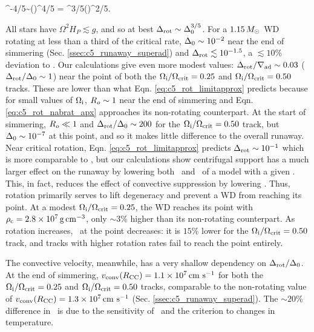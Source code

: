 \eqbegin
\dnabrot {}\rossby^{-4/5}\dnabconvzero \sim \left(\right)^{4/5} = \dnabconvzero^{3/5}\left(\right)^{2/5}.
\label{eq:c5_rot_limitapprox}
\eqend

\noindent All stars have $\Omega^2 H_P \lesssim g$, and so at best $\dnabrot \sim \dnabconvzero^{3/5}$.  For a $1.15\,\Msun$ WD rotating at less than a third of the critical rate, $\dnabconvzero \sim 10^{-2}$ near the end of simmering (Sec. \ref{ssec:c5_runaway_superad}) and $\dnabrot \lesssim 10^{-1.5}$, a $\lesssim10$\% deviation to \nablaad.  Our calculations give even more modest values: $\dnabrot/\nablaad \sim 0.03$ ($\dnabrot/\dnabconvzero \sim 1$) near the \citeal{wooswk04} point of both the $\Ominit/\Omcrit = 0.25$ and $\Ominit/\Omcrit = 0.50$ tracks.  These are lower than what Eqn. \ref{eq:c5_rot_limitapprox} predicts because for small values of $\Ominit$, $\rossby \sim 1$ near the end of simmering and Eqn. \ref{eq:c5_rot_nabrat_apx} approaches its non-rotating counterpart.  At the start of simmering, $\rossby \ll 1$ and $\dnabrot/\dnabconvzero \sim 200$ for the $\Ominit/\Omcrit = 0.50$ track, but $\dnabconvzero \sim 10^{-7}$ at this point, and so it makes little difference to the overall runaway.  Near critical rotation, Eqn. \ref{eq:c5_rot_limitapprox} predicts $\dnabrot \sim 10^{-1}$ which is more comparable to \nablaad, but our calculations show centrifugal support has a much larger effect on the runaway by lowering both \rhoc\ and \Tc\ of a model with a given \Sc.  This, in fact, reduces the effect of convective suppression by lowering \vconv.  Thus, rotation primarily serves to lift degeneracy and prevent a WD from reaching its \citeal{wooswk04} point.  At a modest $\Ominit/\Omcrit = 0.25$, the WD reaches its \citeal{wooswk04} point with $\rhoc = 2.8\times10^7\,\gcc$, only $\sim3$\% higher than its non-rotating counterpart.  As rotation increases, \rhoc\ at the \citeal{wooswk04} point decreases: it is $15$\% lower for the $\Ominit/\Omcrit = 0.50$ track, and tracks with higher rotation rates fail to reach the \citeal{wooswk04} point entirely.

The convective velocity, meanwhile, has a very shallow dependency on $\dnabrot/\dnabconvzero$.  At the end of simmering, $\vconvrcc = 1.1\times10^7\,\cmpsec$ for both the $\Ominit/\Omcrit = 0.25$ and $\Ominit/\Omcrit = 0.50$ tracks, comparable to the non-rotating value of $\vconvrcc = 1.3\times10^7\,\cmpsec$ (Sec. \ref{ssec:c5_runaway_superad}).  The $\sim20$\% difference in \vconvrcc\ is due to the sensitivity of \epscc\ and the \citeal{wooswk04} criterion to changes in temperature. 

